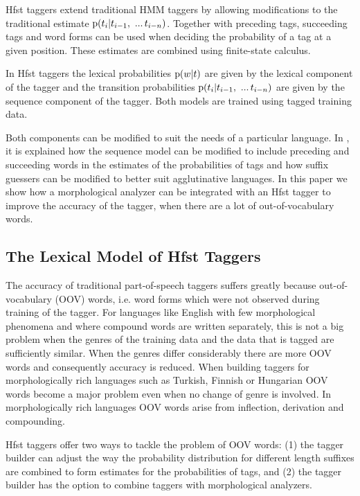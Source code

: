 \documentclass{llncs}
\begin{document}
Hfst taggers extend traditional HMM taggers by allowing modifications
to the traditional estimate ${\rm p}(t_i | t_{i - 1},\ ...\,
t_{i-n})$. Together with preceding tags, succeeding tags and word
forms can be used when deciding the probability of a tag at a given
position. These estimates are combined using finite-state calculus.

In Hfst taggers the lexical probabilities ${\rm p}(w|t)$ are given by
the lexical component of the tagger and the transition probabilities
${\rm p}(t_i | t_{i - 1},\ ...\, t_{i-n})$ are given by the sequence
component of the tagger. Both models are trained using tagged
training data.

Both components can be modified to suit the needs of a particular
language. In \cite{silfverberg/2011/nodalida}, it is explained how the sequence
model can be modified to include preceding and succeeding words in
the estimates of the probabilities of tags and how suffix guessers
can be modified to better suit agglutinative languages. In this paper
we show how a morphological analyzer can be integrated with an Hfst
tagger to improve the accuracy of the tagger, when there are a lot of
out-of-vocabulary words.


\subsection{The Lexical Model of Hfst Taggers}

The accuracy of traditional part-of-speech taggers suffers greatly
because out-of-vocabulary (OOV) words, i.e. word forms which were
not observed during training of the tagger. For languages like
English with few morphological phenomena and where compound words are written separately, this
is not a big problem when the genres of the training data and the data
that is tagged are sufficiently similar. When the genres differ
considerably there are more OOV words and consequently accuracy
is reduced. When building taggers for morphologically rich languages
such as Turkish, Finnish or Hungarian OOV words become a major
problem even when no change of genre is involved. In morphologically
rich languages OOV words arise from inflection, derivation and
compounding.

Hfst taggers offer two ways to tackle the problem of OOV words: (1) the
tagger builder can adjust the way the probability distribution for
different length suffixes are combined to form estimates for the
probabilities of tags, and (2) the tagger builder has the option to combine taggers with
morphological analyzers.
\end{document}
